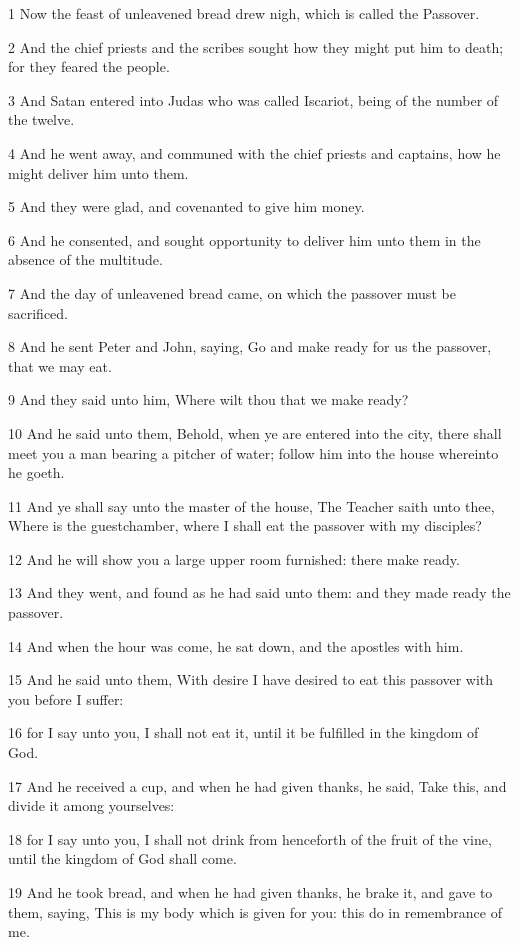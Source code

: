 \par 1 Now the feast of unleavened bread drew nigh, which is called the Passover.
\par 2 And the chief priests and the scribes sought how they might put him to death; for they feared the people.
\par 3 And Satan entered into Judas who was called Iscariot, being of the number of the twelve.
\par 4 And he went away, and communed with the chief priests and captains, how he might deliver him unto them.
\par 5 And they were glad, and covenanted to give him money.
\par 6 And he consented, and sought opportunity to deliver him unto them in the absence of the multitude.
\par 7 And the day of unleavened bread came, on which the passover must be sacrificed.
\par 8 And he sent Peter and John, saying, Go and make ready for us the passover, that we may eat.
\par 9 And they said unto him, Where wilt thou that we make ready?
\par 10 And he said unto them, Behold, when ye are entered into the city, there shall meet you a man bearing a pitcher of water; follow him into the house whereinto he goeth.
\par 11 And ye shall say unto the master of the house, The Teacher saith unto thee, Where is the guestchamber, where I shall eat the passover with my disciples?
\par 12 And he will show you a large upper room furnished: there make ready.
\par 13 And they went, and found as he had said unto them: and they made ready the passover.
\par 14 And when the hour was come, he sat down, and the apostles with him.
\par 15 And he said unto them, With desire I have desired to eat this passover with you before I suffer:
\par 16 for I say unto you, I shall not eat it, until it be fulfilled in the kingdom of God.
\par 17 And he received a cup, and when he had given thanks, he said, Take this, and divide it among yourselves:
\par 18 for I say unto you, I shall not drink from henceforth of the fruit of the vine, until the kingdom of God shall come.
\par 19 And he took bread, and when he had given thanks, he brake it, and gave to them, saying, This is my body which is given for you: this do in remembrance of me.
